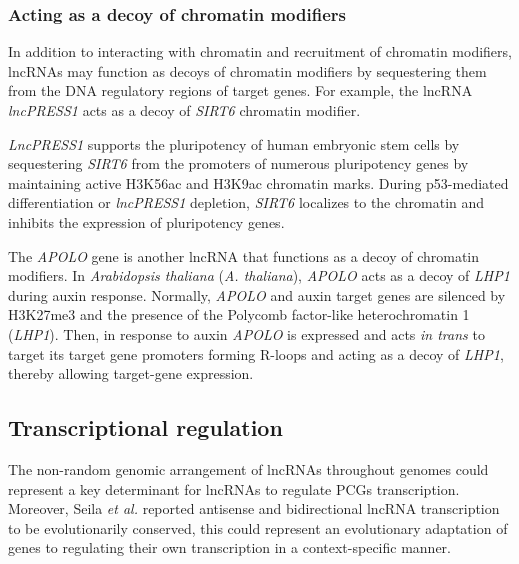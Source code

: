 \subsubsection{Acting as a decoy of chromatin modifiers}
\label{sub-sub-sec:decoy_lncRNA}

In addition to interacting with chromatin and recruitment of chromatin modifiers, lncRNAs may function as decoys of chromatin modifiers by sequestering them from the DNA regulatory regions of target genes. For example, the lncRNA \textit{lncPRESS1} acts as a decoy of \textit{SIRT6} chromatin modifier.\autocite{jain_2016_lncpress1}

\textit{LncPRESS1} supports the pluripotency of human embryonic stem cells by sequestering \textit{SIRT6} from the promoters of numerous pluripotency genes by maintaining active H3K56ac and H3K9ac chromatin marks. During p53-mediated differentiation or \textit{lncPRESS1} depletion, \textit{SIRT6} localizes to the chromatin and inhibits the expression of pluripotency genes.\autocite{jain_2016_lncpress1}

The \textit{APOLO} gene is another lncRNA that functions as a decoy of chromatin modifiers.\autocite{mas_2020_apolo} In \textit{Arabidopsis thaliana} (\textit{A. thaliana}), \textit{APOLO} acts as a decoy of \textit{LHP1} during auxin response. Normally, \textit{APOLO} and auxin target genes are silenced by H3K27me3 and the presence of the Polycomb factor-like heterochromatin 1 (\textit{LHP1}). Then, in response to auxin \textit{APOLO} is expressed and acts \textit{in trans} to target its target gene promoters forming R-loops and acting as a decoy of \textit{LHP1}, thereby allowing target-gene expression.\autocite{ariel_2020_apolo}

\subsection{Transcriptional regulation}
\label{sub-sec:lncRNA_transcriptional_reg}

The non-random genomic arrangement of lncRNAs throughout genomes could represent a key determinant for lncRNAs to regulate PCGs transcription. Moreover, Seila \textit{et al.} reported antisense and bidirectional lncRNA transcription to be evolutionarily conserved, this could represent an evolutionary adaptation of genes to regulating their own transcription in a context-specific manner.\autocite{seila_2008_divergent}

